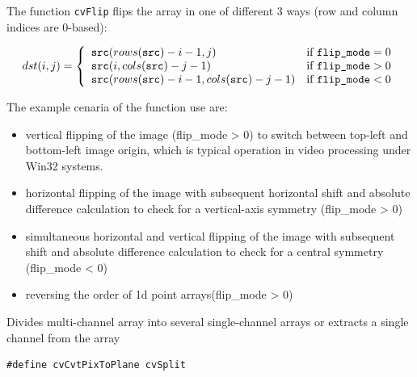 \begin{description}
\end{description}

The function \texttt{cvFlip} flips the array in one of different 3 ways (row and column indices are 0-based):

\[
dst(i,j) = \left\{ \begin{array}{l l} \texttt{src}(rows(\texttt{src})-i-1,j) & \mbox{if $\texttt{flip\_mode} = 0$}\\ \texttt{src}(i,cols(\texttt{src})-j-1) & \mbox{if $\texttt{flip\_mode} > 0$}\\ \texttt{src}(rows(\texttt{src})-i-1,cols(\texttt{src})-j-1) & \mbox{if $\texttt{flip\_mode} < 0$}\\ \end{array} \right.
\]

The example cenaria of the function use are:
\begin{itemize}
  \item vertical flipping of the image (flip\_mode > 0) to switch between top-left and bottom-left image origin, which is typical operation in video processing under Win32 systems.
  \item horizontal flipping of the image with subsequent horizontal shift and absolute difference calculation to check for a vertical-axis symmetry (flip\_mode > 0)
  \item simultaneous horizontal and vertical flipping of the image with subsequent shift and absolute difference calculation to check for a central symmetry (flip\_mode < 0)
  \item reversing the order of 1d point arrays(flip\_mode > 0)
\end{itemize}

\label{Split}

Divides multi-channel array into several single-channel arrays or extracts a single channel from the array


\begin{lstlisting}
#define cvCvtPixToPlane cvSplit
\end{lstlisting}

\begin{description}
\end{description}

